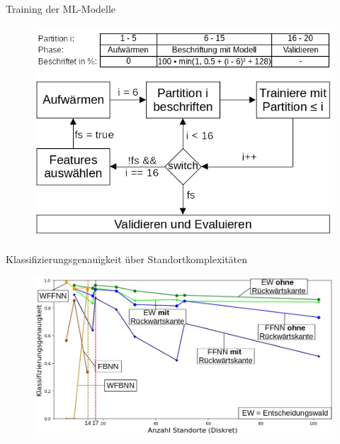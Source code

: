 \documentclass[10pt]{beamer}
\begin{document}
\begin{frame}{Training der ML-Modelle}
    \begin{figure}
        \centering
        \includegraphics[width=\linewidth]{model/training_explained.png}
    \end{figure}
\end{frame}

\begin{frame}{Klassifizierungsgenauigkeit über Standortkomplexitäten}
    \begin{figure}
        \centering
        \includegraphics[width=\linewidth]{location_recognition/graph_comb.jpg}
    \end{figure}
\end{frame}
\end{document}
